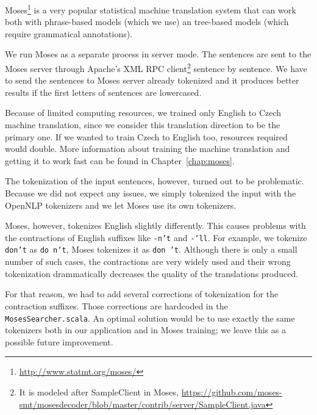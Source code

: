 Moses\footnote{\url{http://www.statmt.org/moses/}} is a very popular statistical machine translation system that can work both with phrase-based models (which we use) an tree-based models (which require grammatical annotations).

We run Moses as a separate process in server mode. The sentences are sent to the Moses server through Apache's XML RPC client\footnote{It is modeled after SampleClient in Moses, \url{https://github.com/moses-smt/mosesdecoder/blob/master/contrib/server/SampleClient.java}} sentence by sentence. We have to send the sentences to Moses server already tokenized and it produces better results if the first letters of sentences are lowercased.

Because of limited computing resources, we trained only English to Czech machine translation, since we consider this translation direction to be the primary one. If we wanted to train Czech to English too, resources required would double. More information about training the machine translation and getting it to work fast can be found in Chapter~\ref{chap:moses}.

The tokenization of the input sentences, however, turned out to be problematic. Because we did not expect any issues,
we simply tokenized the input with the OpenNLP tokenizers and we let Moses use its own tokenizers.

Moses, however, tokenizes English slightly differently. This causes problems with the contractions of English suffixes like \texttt{-n't} and \texttt{-'ll}. For example, we tokenize \texttt{don't} as \texttt{do n't}, Moses tokenizes it as \texttt{don 't}. Although there is only a small number of such cases, the contractions are very widely used and their wrong tokenization
drammatically decreases the quality of the translations produced.

For that reason, we had to add several corrections of tokenization for the contraction suffixes.
Those corrections are hardcoded in the \texttt{MosesSearcher.scala}.
An optimal solution would be to use exactly the same tokenizers both in our application and in Moses training; we leave this as a possible future improvement.

